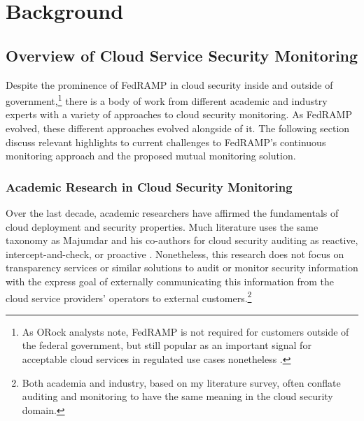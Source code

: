 \documentclass{jdf}
\begin{document}
\section{Background}

\subsection{Overview of Cloud Service Security Monitoring}

Despite the prominence of FedRAMP in cloud security inside and outside of government,\footnote{As ORock analysts note, FedRAMP is not required for customers outside of the federal government, but still popular as an important signal for acceptable cloud services in regulated use cases nonetheless \citeyear{orock21}.} there is a body of work from different academic and industry experts with a variety of approaches to cloud security monitoring. As FedRAMP evolved, these different approaches evolved alongside of it. The following section discuss relevant highlights to current challenges to FedRAMP's continuous monitoring approach and the proposed mutual monitoring solution.

\subsubsection{Academic Research in Cloud Security Monitoring}

Over the last decade, academic researchers have affirmed the fundamentals of cloud deployment and security properties. Much literature uses the same taxonomy as Majumdar and his co-authors for cloud security auditing as reactive, intercept-and-check, or proactive \citeyear[pp.~9-13]{majumdar19}. Nonetheless, this research does not focus on transparency services or similar solutions to audit or monitor security information with the express goal of externally communicating this information from the cloud service providers' operators to external customers.\footnote{Both academia and industry, based on my literature survey, often conflate auditing and monitoring to have the same meaning in the cloud security domain.}
\end{document}
